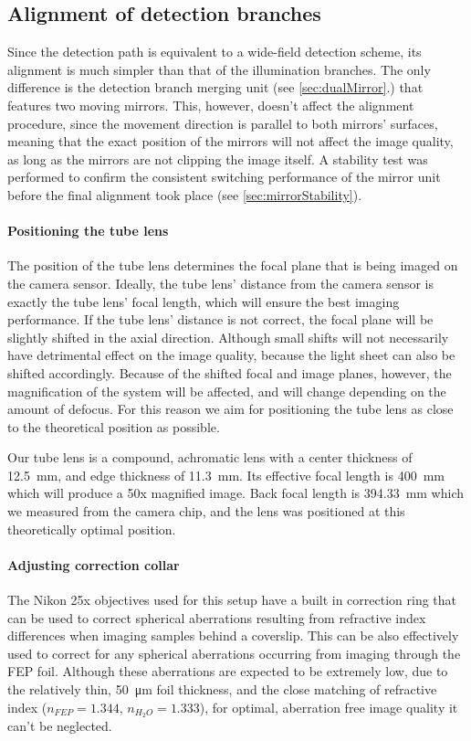   \subsection{Alignment of detection branches}
    Since the detection path is equivalent to a wide-field detection scheme, its alignment is much simpler than that of the illumination branches. The only difference is the detection branch merging unit (see \autoref{sec:dualMirror}.) that features two moving mirrors. This, however, doesn't affect the alignment procedure, since the movement direction is parallel to both mirrors' surfaces, meaning that the exact position of the mirrors will not affect the image quality, as long as the mirrors are not clipping the image itself. A stability test was performed to confirm the consistent switching performance of the mirror unit before the final alignment took place (see \autoref{sec:mirrorStability}).


    \paragraph{Positioning the tube lens}
      The position of the tube lens determines the focal plane that is being imaged on the camera sensor. Ideally, the tube lens' distance from the camera sensor is exactly the tube lens' focal length, which will ensure the best imaging performance. If the tube lens' distance is not correct, the focal plane will be slightly shifted in the axial direction. Although small shifts will not necessarily have detrimental effect on the image quality, because the light sheet can also be shifted accordingly. Because of the shifted focal and image planes, however, the magnification of the system will be affected, and will change depending on the amount of defocus. For this reason we aim for positioning the tube lens as close to the theoretical position as possible.

      Our tube lens is a compound, achromatic lens with a center thickness of \SI{12.5}{mm}, and edge thickness of \SI{11.3}{mm}. Its effective focal length is \SI{400}{mm} which will produce a 50x magnified image. Back focal length is \SI{394.33}{mm} which we measured from the camera chip, and the lens was positioned at this theoretically optimal position.

    \paragraph{Adjusting correction collar}
      The Nikon 25x objectives used for this setup have a built in correction ring that can be used to correct spherical aberrations resulting from refractive index differences when imaging samples behind a coverslip. This can be also effectively used to correct for any spherical aberrations occurring from imaging through the FEP foil. Although these aberrations are expected to be extremely low, due to the relatively thin, \SI{50}{\micro m} foil thickness, and the close matching of refractive index ($n_{FEP} = 1.344$, $n_{H_2O}=1.333$), for optimal, aberration free image quality it can't be neglected.

